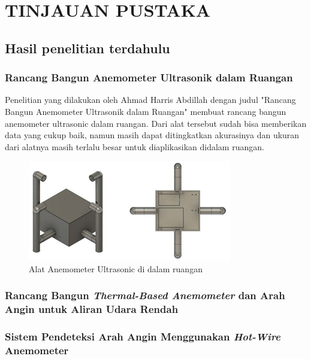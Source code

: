\section{TINJAUAN PUSTAKA}

\subsection{Hasil penelitian terdahulu}
\subsubsection{Rancang Bangun Anemometer Ultrasonik dalam Ruangan}
Penelitian yang dilakukan oleh Ahmad Harris Abdillah dengan judul "Rancang Bangun Anemometer Ultrasonik dalam Ruangan" membuat rancang bangun anemometer ultrasonic dalam ruangan. Dari alat tersebut sudah bisa memberikan data yang cukup baik, namun masih dapat ditingkatkan akurasinya dan ukuran dari alatnya masih terlalu besar untuk diaplikasikan didalam ruangan.

\begin{figure}[h!]
	\label{abdillah_anemo_skema}
	\includegraphics[width=\linewidth]{gambar/fig_anemometer_abdillah_skema}
	\caption{Alat Anemometer Ultrasonic di dalam ruangan
	\parencite{Abdillah, 2022}}
\end{figure}

\subsubsection{Rancang Bangun \emph{Thermal-Based Anemometer} dan Arah Angin untuk Aliran Udara Rendah}

\subsubsection{Sistem Pendeteksi Arah Angin Menggunakan \textit{Hot-Wire} Anemometer}

